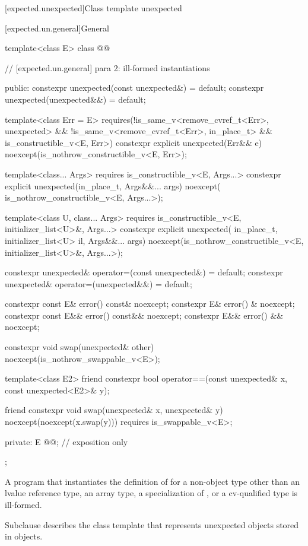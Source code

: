 [expected.unexpected]{Class template unexpected}

[expected.un.general]{General}

\begin{codeblock}
template<class E>
class @@ {
  // [expected.un.general] para 2: ill-formed instantiations

public:
  constexpr unexpected(const unexpected&) = default;
  constexpr unexpected(unexpected&&) = default;

  template<class Err = E>
    requires(!is_same_v<remove_cvref_t<Err>, unexpected> &&
             !is_same_v<remove_cvref_t<Err>, in_place_t> && is_constructible_v<E, Err>)
  constexpr explicit unexpected(Err&& e) noexcept(is_nothrow_constructible_v<E, Err>);

  template<class... Args>
    requires is_constructible_v<E, Args...>
  constexpr explicit unexpected(in_place_t, Args&&... args) noexcept(
      is_nothrow_constructible_v<E, Args...>);

  template<class U, class... Args>
    requires is_constructible_v<E, initializer_list<U>&, Args...>
  constexpr explicit unexpected(
      in_place_t, initializer_list<U> il,
      Args&&... args) noexcept(is_nothrow_constructible_v<E, initializer_list<U>&,
                                                          Args...>);

  constexpr unexpected& operator=(const unexpected&) = default;
  constexpr unexpected& operator=(unexpected&&) = default;

  constexpr const E& error() const& noexcept;
  constexpr E& error() & noexcept;
  constexpr const E&& error() const&& noexcept;
  constexpr E&& error() && noexcept;

  constexpr void swap(unexpected& other) noexcept(is_nothrow_swappable_v<E>);

  template<class E2>
  friend constexpr bool operator==(const unexpected& x, const unexpected<E2>& y);

  friend constexpr void swap(unexpected& x, unexpected& y) noexcept(noexcept(x.swap(y)))
    requires is_swappable_v<E>;

private:
  E @@; // exposition only
};
\end{codeblock}

\begin{itemdescr}
\pnum
\mandates
A program that instantiates the definition of  for a non-object type other than an lvalue reference type, an array type, a specialization of , or a cv-qualified type is ill-formed.

\pnum
\remarks
Subclause  describes the class template  that represents unexpected objects stored in  objects.
\end{itemdescr}


